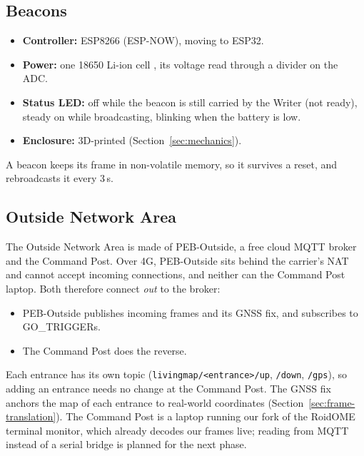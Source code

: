 \subsection{Beacons}

\begin{itemize}
  \item \textbf{Controller:} ESP8266 (ESP-NOW), moving to ESP32.
  \item \textbf{Power:} one 18650 Li-ion cell , its voltage
    read through a divider on the ADC.
  \item \textbf{Status LED:} off while the beacon is still carried by the
    Writer (not ready), steady on while broadcasting, blinking when the
    battery is low.
  \item \textbf{Enclosure:} 3D-printed (Section~\ref{sec:mechanics}).
\end{itemize}
A beacon keeps its frame in non-volatile memory, so it survives a reset, and
rebroadcasts it every 3\,s.

\subsection{Outside Network Area}

The Outside Network Area is made of PEB-Outside, a free cloud MQTT broker
and the Command Post. Over 4G, PEB-Outside sits behind the carrier's NAT and
cannot accept incoming connections, and neither can the Command Post laptop.
Both therefore connect \emph{out} to the broker:
\begin{itemize}
  \item PEB-Outside publishes incoming frames and its GNSS fix, and
    subscribes to GO\_TRIGGERs.
  \item The Command Post does the reverse.
\end{itemize}
Each entrance has its own topic (\texttt{livingmap/<entrance>/up},
\texttt{/down}, \texttt{/gps}), so adding an entrance needs no change at the
Command Post. The GNSS fix anchors the map of each entrance to real-world
coordinates (Section~\ref{sec:frame-translation}). The Command Post is a
laptop running our fork of the RoidOME terminal monitor, which already decodes
our frames live; reading from MQTT instead of a serial bridge is planned
for the next phase.
